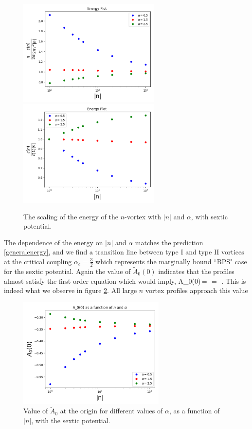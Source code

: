  \begin{figure}[H]
\begin{center}
 \includegraphics[width=2.8in]{Chapter_2_Folder_1912.11321/figures/sixth_order_alpha.pdf}\hspace{0.1in}\includegraphics[width=2.8in]{Chapter_2_Folder_1912.11321/figures/sixth_order_alpha_byE1.pdf}
     \caption{{ \small The scaling of the energy of the $n$-vortex with $|n|$ and $\alpha$, with sextic potential.}} \label{sexticenergy}
    \end{center}
\end{figure}
The dependence of the energy on $|n|$ and $\alpha$ matches the prediction \eqref{generalenergy}, and we find a transition line between type I and type II vortices at the critical coupling $\alpha_c = \tfrac32$ which represents the marginally bound ``BPS" case for the sextic potential.   Again the value of $\tilde A_0(0)$ indicates that the profiles almost satisfy the first order equation which would imply,
\be
\tilde A_0(0)\,=\,-\,=\,-\,.
\ee
This is indeed what we observe in figure \ref{A0sextic}. All large $n$ vortex profiles approach this value
\begin{figure}[H]
\begin{center}
 \includegraphics[width=2.9in]{Chapter_2_Folder_1912.11321/figures/sixth_order_A0.pdf}     \caption{{ \small Value of $\tilde A_0$ at the origin for different values of $\alpha$, as a function of $|n|$,  
 with the sextic potential.}} \label{A0sextic}
    \end{center}
\end{figure}
